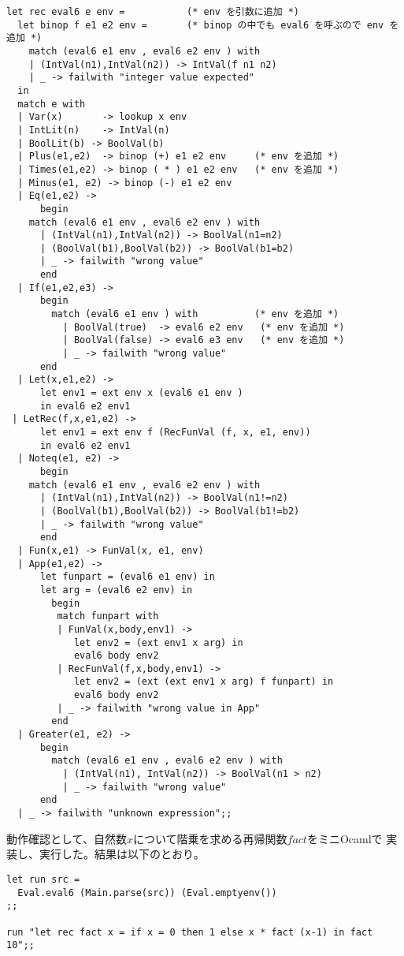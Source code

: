 \documentclass[a4paper,9pt]{jsarticle}
\begin{document}
\begin{lstlisting}
let rec eval6 e env =           (* env を引数に追加 *)
  let binop f e1 e2 env =       (* binop の中でも eval6 を呼ぶので env を追加 *)
    match (eval6 e1 env , eval6 e2 env ) with
    | (IntVal(n1),IntVal(n2)) -> IntVal(f n1 n2)
    | _ -> failwith "integer value expected"
  in 
  match e with
  | Var(x)       -> lookup x env
  | IntLit(n)    -> IntVal(n)
  | BoolLit(b) -> BoolVal(b)
  | Plus(e1,e2)  -> binop (+) e1 e2 env     (* env を追加 *)
  | Times(e1,e2) -> binop ( * ) e1 e2 env   (* env を追加 *)
  | Minus(e1, e2) -> binop (-) e1 e2 env
  | Eq(e1,e2) ->
      begin
	match (eval6 e1 env , eval6 e2 env ) with
	  | (IntVal(n1),IntVal(n2)) -> BoolVal(n1=n2)
	  | (BoolVal(b1),BoolVal(b2)) -> BoolVal(b1=b2)
	  | _ -> failwith "wrong value"
      end
  | If(e1,e2,e3) ->
      begin
        match (eval6 e1 env ) with          (* env を追加 *)
          | BoolVal(true)  -> eval6 e2 env   (* env を追加 *)
          | BoolVal(false) -> eval6 e3 env   (* env を追加 *)
          | _ -> failwith "wrong value"
      end
  | Let(x,e1,e2) -> 
      let env1 = ext env x (eval6 e1 env )
      in eval6 e2 env1 
 | LetRec(f,x,e1,e2) ->
      let env1 = ext env f (RecFunVal (f, x, e1, env))
      in eval6 e2 env1
  | Noteq(e1, e2) ->
      begin
	match (eval6 e1 env , eval6 e2 env ) with
	  | (IntVal(n1),IntVal(n2)) -> BoolVal(n1!=n2)
	  | (BoolVal(b1),BoolVal(b2)) -> BoolVal(b1!=b2)
	  | _ -> failwith "wrong value"
      end
  | Fun(x,e1) -> FunVal(x, e1, env)
  | App(e1,e2) ->
      let funpart = (eval6 e1 env) in
      let arg = (eval6 e2 env) in
        begin
         match funpart with
         | FunVal(x,body,env1) ->
            let env2 = (ext env1 x arg) in
            eval6 body env2
         | RecFunVal(f,x,body,env1) ->
            let env2 = (ext (ext env1 x arg) f funpart) in
            eval6 body env2
         | _ -> failwith "wrong value in App"
        end
  | Greater(e1, e2) -> 
      begin
        match (eval6 e1 env , eval6 e2 env ) with
          | (IntVal(n1), IntVal(n2)) -> BoolVal(n1 > n2)
          | _ -> failwith "wrong value"
      end
  | _ -> failwith "unknown expression";;
\end{lstlisting}


動作確認として、自然数$x$について階乗を求める再帰関数$fact$をミニOcamlで
実装し、実行した。結果は以下のとおり。

\begin{lstlisting}
let run src =
  Eval.eval6 (Main.parse(src)) (Eval.emptyenv())
;;

run "let rec fact x = if x = 0 then 1 else x * fact (x-1) in fact 10";;
\end{lstlisting}
\end{document}
